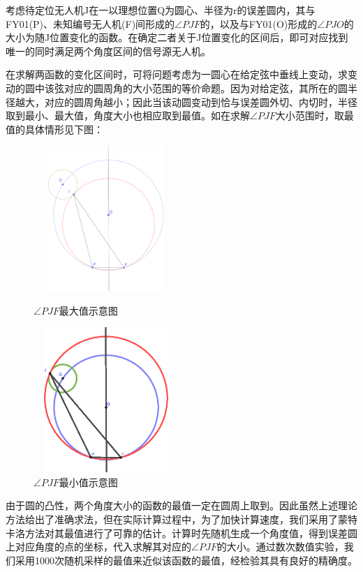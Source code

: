 \documentclass{ctexart}
\begin{document}
  考虑待定位无人机J在一以理想位置Q为圆心、半径为r的误差圆内，其与FY01(P)、未知编号无人机(F)间形成的$\angle PJF$的，以及与FY01(O)形成的$\angle PJO$的大小为随J位置变化的函数。在确定二者关于J位置变化的区间后，即可对应找到唯一的同时满足两个角度区间的信号源无人机。

在求解两函数的变化区间时，可将问题考虑为一圆心在给定弦中垂线上变动，求变动的圆中该弦对应的圆周角的大小范围的等价命题。因为对给定弦，其所在的圆半径越大，对应的圆周角越小；因此当该动圆变动到恰与误差圆外切、内切时，半径取到最小、最大值，角度大小也相应取到最值。如在求解$\angle PJF$大小范围时，取最值的具体情形见下图：

  \begin{figure}[H]
    \begin{minipage}[t]{0.45\linewidth}
    \centering
    \includegraphics[height=5.5cm,width=5.5cm]{pic/angle_max.eps}
    \caption{$\angle PJF$最大值示意图}
    \end{minipage}%
    \begin{minipage}[t]{0.45\linewidth}
    \centering
    \includegraphics[height=5.5cm,width=5.5cm]{pic/angle_min.eps}
    \caption{$\angle PJF$最小值示意图}
    \end{minipage}
    \end{figure}


由于圆的凸性，两个角度大小的函数的最值一定在圆周上取到。因此虽然上述理论方法给出了准确求法，但在实际计算过程中，为了加快计算速度，我们采用了蒙特卡洛方法对其最值进行了可靠的估计。计算时先随机生成一个角度值，得到误差圆上对应角度的点的坐标，代入求解其对应的$\angle PJF$的大小。通过数次数值实验，我们采用1000次随机采样的最值来近似该函数的最值，经检验其具有良好的精确度。
\end{document}
